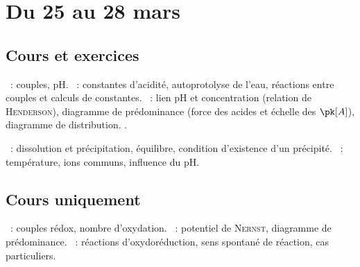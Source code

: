 \documentclass[a4paper, 12pt, final, garamond]{book}
\begin{document}
\setcounter{chapter}{21}

\chapter{Du 25 au 28 mars}

\section{Cours et exercices}
\begin{enumerate}[label=\Roman*]
	~: couples, pH.
	~: constantes
	d'acidité, autoprotolyse de l'eau, réactions entre couples et calculs de
	constantes.
	~: lien pH et concentration
	(relation de \textsc{Henderson}), diagramme de prédominance (force des
	acides et échelle des $\pk[A]$), diagramme
	de distribution.
	.
\end{enumerate}

\begin{enumerate}[label=\Roman*]
	~: dissolution et précipitation,
	équilibre, condition d'existence d'un précipité.
	~: température, ions communs,
	influence du pH.
\end{enumerate}

\section{Cours uniquement}
\begin{enumerate}[label=\Roman*]
	~: couples rédox, nombre d'oxydation.
	~: potentiel de \textsc{Nernst},
	diagramme de prédominance.
	~: réactions d'oxydoréduction, sens spontané de
	réaction, cas particuliers.
\end{enumerate}

\newpage
\end{document}
